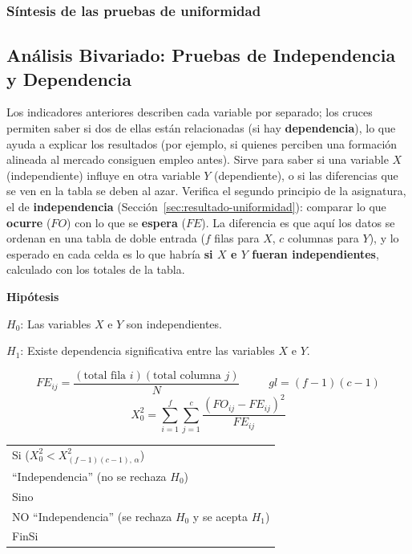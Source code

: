 \documentclass[12pt, a4paper]{article}
\begin{document}









\subsubsection*{Síntesis de las pruebas de uniformidad}



\subsection{Análisis Bivariado: Pruebas de Independencia y Dependencia}\label{sec:cruces}

Los indicadores anteriores describen cada variable por separado; los
cruces permiten saber si dos de ellas están relacionadas (si hay
\textbf{dependencia}), lo que ayuda a explicar los resultados (por
ejemplo, si quienes perciben una formación alineada al mercado consiguen
empleo antes). Sirve para saber si una variable $X$ (independiente)
influye en otra variable $Y$ (dependiente), o si las diferencias que se
ven en la tabla se deben al azar. Verifica el segundo principio de la
asignatura, el de \textbf{independencia} (Sección~\ref{sec:resultado-uniformidad}):
comparar lo que \textbf{ocurre} ($FO$) con lo que se \textbf{espera}
($FE$). La diferencia es que aquí los datos se ordenan en una tabla de
doble entrada ($f$ filas para $X$, $c$ columnas para $Y$), y lo esperado
en cada celda es lo que habría \textbf{si $X$ e $Y$ fueran
independientes}, calculado con los totales de la tabla.

\textbf{Hipótesis}

$H_0$: Las variables $X$ e $Y$ son independientes.

$H_1$: Existe dependencia significativa entre las variables $X$ e $Y$.

\[
\boxed{\;FE_{ij} = \frac{(\text{total fila } i)(\text{total columna } j)}{N}\;}
\qquad
\boxed{\;gl = (f-1)(c-1)\;}
\]
\[
\boxed{\;X_0^2 = \sum_{i=1}^{f}\sum_{j=1}^{c} \frac{(FO_{ij} - FE_{ij})^2}{FE_{ij}}\;}
\]

\begin{center}
\begin{tabular}{l}
Si ($X_0^2 < X^2_{(f-1)(c-1),\,\alpha}$)\\
\quad ``Independencia'' (no se rechaza $H_0$)\\
Sino\\
\quad NO ``Independencia'' (se rechaza $H_0$ y se acepta $H_1$)\\
FinSi
\end{tabular}
\end{center}
\end{document}
